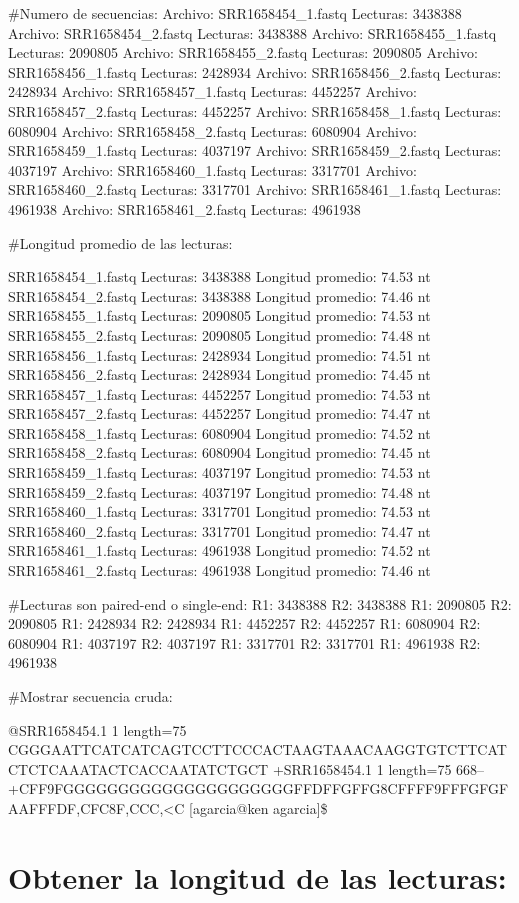 \documentclass[
  letterpaper,
  DIV=11,
  numbers=noendperiod]{scrartcl}
\begin{document}
\#Numero de secuencias: Archivo: SRR1658454\_1.fastq Lecturas: 3438388
Archivo: SRR1658454\_2.fastq Lecturas: 3438388 Archivo:
SRR1658455\_1.fastq Lecturas: 2090805 Archivo: SRR1658455\_2.fastq
Lecturas: 2090805 Archivo: SRR1658456\_1.fastq Lecturas: 2428934
Archivo: SRR1658456\_2.fastq Lecturas: 2428934 Archivo:
SRR1658457\_1.fastq Lecturas: 4452257 Archivo: SRR1658457\_2.fastq
Lecturas: 4452257 Archivo: SRR1658458\_1.fastq Lecturas: 6080904
Archivo: SRR1658458\_2.fastq Lecturas: 6080904 Archivo:
SRR1658459\_1.fastq Lecturas: 4037197 Archivo: SRR1658459\_2.fastq
Lecturas: 4037197 Archivo: SRR1658460\_1.fastq Lecturas: 3317701
Archivo: SRR1658460\_2.fastq Lecturas: 3317701 Archivo:
SRR1658461\_1.fastq Lecturas: 4961938 Archivo: SRR1658461\_2.fastq
Lecturas: 4961938

\#Longitud promedio de las lecturas:

SRR1658454\_1.fastq Lecturas: 3438388 Longitud promedio: 74.53 nt
SRR1658454\_2.fastq Lecturas: 3438388 Longitud promedio: 74.46 nt
SRR1658455\_1.fastq Lecturas: 2090805 Longitud promedio: 74.53 nt
SRR1658455\_2.fastq Lecturas: 2090805 Longitud promedio: 74.48 nt
SRR1658456\_1.fastq Lecturas: 2428934 Longitud promedio: 74.51 nt
SRR1658456\_2.fastq Lecturas: 2428934 Longitud promedio: 74.45 nt
SRR1658457\_1.fastq Lecturas: 4452257 Longitud promedio: 74.53 nt
SRR1658457\_2.fastq Lecturas: 4452257 Longitud promedio: 74.47 nt
SRR1658458\_1.fastq Lecturas: 6080904 Longitud promedio: 74.52 nt
SRR1658458\_2.fastq Lecturas: 6080904 Longitud promedio: 74.45 nt
SRR1658459\_1.fastq Lecturas: 4037197 Longitud promedio: 74.53 nt
SRR1658459\_2.fastq Lecturas: 4037197 Longitud promedio: 74.48 nt
SRR1658460\_1.fastq Lecturas: 3317701 Longitud promedio: 74.53 nt
SRR1658460\_2.fastq Lecturas: 3317701 Longitud promedio: 74.47 nt
SRR1658461\_1.fastq Lecturas: 4961938 Longitud promedio: 74.52 nt
SRR1658461\_2.fastq Lecturas: 4961938 Longitud promedio: 74.46 nt

\#Lecturas son paired-end o single-end: R1: 3438388 R2: 3438388 R1:
2090805 R2: 2090805 R1: 2428934 R2: 2428934 R1: 4452257 R2: 4452257 R1:
6080904 R2: 6080904 R1: 4037197 R2: 4037197 R1: 3317701 R2: 3317701 R1:
4961938 R2: 4961938

\#Mostrar secuencia cruda:

@SRR1658454.1 1 length=75
CGGGAATTCATCATCAGTCCTTCCCACTAAGTAAACAAGGTGTCTTCATCTCTCAAATACTCACCAATATCTGCT
+SRR1658454.1 1 length=75
668--+CFF9FGGGGGGGGGGGGGGGGGGGGGFFDFFGFFG8CFFFF9FFFGFGFAAFFFDF,CFC8F,CCC,\textless C
{[}agarcia@ken agarcia{]}\$

\section{Obtener la longitud de las
lecturas:}\label{obtener-la-longitud-de-las-lecturas-1}
\end{document}
